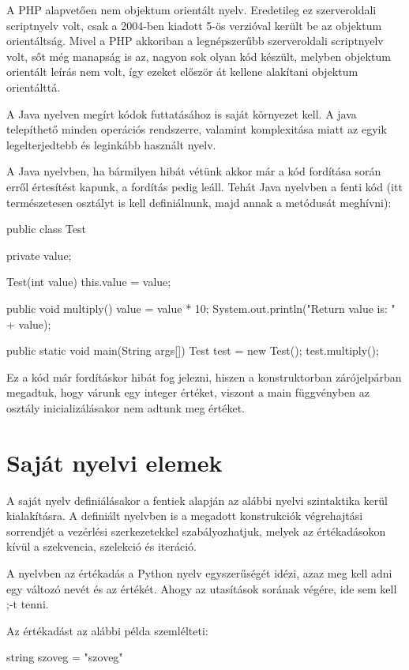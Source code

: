 A PHP alapvetően nem objektum orientált nyelv. Eredetileg ez szerveroldali scriptnyelv volt, csak a 2004-ben kiadott 5-ös verzióval került be az objektum orientáltság. Mivel a PHP akkoriban a legnépszerűbb szerveroldali scriptnyelv volt, sőt még manapság is az, nagyon sok olyan kód készült, melyben objektum orientált leírás nem volt, így ezeket először át kellene alakítani objektum orientálttá.

A Java nyelven megírt kódok futtatásához is saját környezet kell. A java telepíthető minden operációs rendszerre, valamint komplexitása miatt az egyik legelterjedtebb és leginkább használt nyelv.

A Java nyelvben, ha bármilyen hibát vétünk akkor már a kód fordítása során erről értesítést kapunk, a fordítás pedig leáll. Tehát Java nyelvben a fenti kód (itt természetesen osztályt is kell definiálnunk, majd annak a metódusát meghívni):

\begin{cpp}
public class Test {
    private value;
    
    Test(int value) {
        this.value = value;
    }

   public void multiply() {
      value = value * 10;
      System.out.println("Return value is: " + value);
   }

   public static void main(String args[]) {
      Test test = new Test();
      test.multiply();
   }
}
\end{cpp}

Ez a kód már fordításkor hibát fog jelezni, hiszen a konstruktorban zárójelpárban megadtuk, hogy várunk egy integer értéket, viszont a main függvényben az osztály inicializálásakor nem adtunk meg értéket. 
\section{Saját nyelvi elemek}
A saját nyelv definiálásakor a fentiek alapján az alábbi nyelvi szintaktika kerül kialakításra.
A definiált nyelvben is a megadott konstrukciók végrehajtási sorrendjét a vezérlési szerkezetekkel szabályozhatjuk, melyek az értékadásokon kívül a szekvencia, szelekció és iteráció.

A nyelvben az értékadás a Python nyelv egyszerűségét idézi, azaz meg kell adni egy változó nevét és az értékét. Ahogy az utasítások sorának végére, ide sem kell ;-t tenni.

Az értékadást az alábbi példa szemlélteti:
\begin{cpp}
string szoveg = "szoveg"
\end{cpp}

